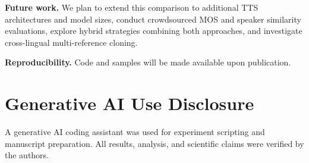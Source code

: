 \documentclass{Interspeech}
\begin{document}
\textbf{Future work.}
We plan to extend this comparison to additional TTS architectures and model sizes, conduct crowdsourced MOS and speaker similarity evaluations, explore hybrid strategies combining both approaches, and investigate cross-lingual multi-reference cloning.

\textbf{Reproducibility.}
Code and samples will be made available upon publication.

\clearpage
\section*{Generative AI Use Disclosure}
A generative AI coding assistant was used for experiment scripting and manuscript preparation.
All results, analysis, and scientific claims were verified by the authors.




\end{document}
